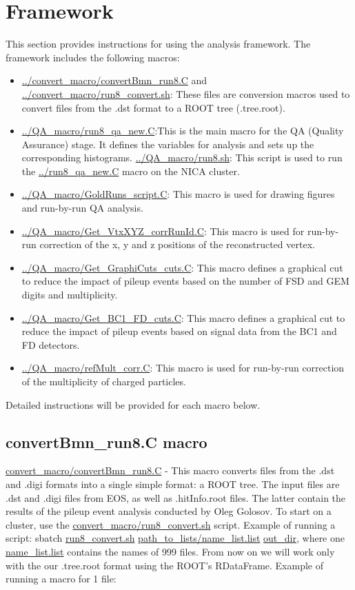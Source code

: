 \section{Framework}

    This section provides instructions for using the analysis framework. The framework includes the following macros:
    \begin{itemize}
        \item \url{../convert_macro/convertBmn_run8.C} and \url{../convert_macro/run8_convert.sh}: These files are conversion macros used to convert files from the .dst format to a ROOT tree (.tree.root).
        \item \url{../QA_macro/run8_qa_new.C}:This is the main macro for the QA (Quality Assurance) stage. It defines the variables for analysis and sets up the corresponding histograms. \url{../QA_macro/run8.sh}: This script is used to run the  \url{../run8_qa_new.C} macro on the NICA cluster.
        \item \url{../QA_macro/GoldRuns_script.C}: This macro is used for drawing figures and run-by-run QA analysis.
        \item \url{../QA_macro/Get_VtxXYZ_corrRunId.C}: This macro is used for run-by-run correction of the x, y and z positions of the reconstructed vertex.
        \item \url{../QA_macro/Get_GraphiCuts_cuts.C}: This macro defines a graphical cut to reduce the impact of pileup events based on the number of FSD and GEM digits and multiplicity.
        \item \url{../QA_macro/Get_BC1_FD_cuts.C}: This macro defines a graphical cut to reduce the impact of pileup events based on signal data from the BC1 and FD detectors.
        \item \url{../QA_macro/refMult_corr.C}: This macro is used for run-by-run correction of the multiplicity of charged particles.
    \end{itemize}
    Detailed instructions will be provided for each macro below.

\subsection{convertBmn\_run8.C macro}\label{convert}

    \url{convert_macro/convertBmn_run8.C} - This macro converts files from the .dst and .digi formats into a single simple format: a ROOT tree. 
    The input files are .dst and .digi files from EOS, as well as .hitInfo.root files. The latter contain the results of the pileup event analysis conducted by Oleg Golosov.
    To start on a cluster, use the \url{convert_macro/run8_convert.sh} script. 
    Example of running a script: sbatch \url{run8_convert.sh} \url{path_to_lists/name_list.list} \url{out_dir}, 
    where one \url{name_list.list} contains the names of 999 files. From now on we will work only with the our .tree.root format using the ROOT's RDataFrame.
    Example of running a macro for 1 file:
    
